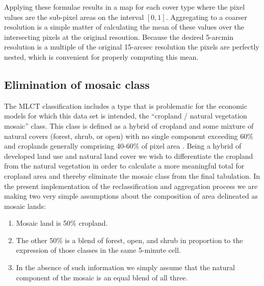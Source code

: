 Applying these formulae results in a map for each cover type where the
pixel values are the sub-pixel areas on the interval $[0,1]$.
Aggregating to a coarser resolution is a simple matter of calculating
the mean of these values over the intersecting pixels at the original
resoution.  Because the desired 5-arcmin resolution is a multiple of
the original 15-arcsec resolution the pixels are perfectly nested,
which is convenient for properly computing this mean.


\subsection{Elimination of mosaic class}
\label{sec:elimination}

The MLCT classification includes a type that is problematic for the
economic models for which this data set is intended, the ``cropland /
natural vegetation mosaic'' class.  This class is defined as a hybrid
of cropland and some mixture of natural covers (forest, shrub, or
open) with no single component exceeding 60\% \citep{Friedl2002} and
croplands generally comprising 40-60\% of pixel area . Being a hybrid of developed land use and natural land cover
we wish to differentiate the cropland from the natural vegetation in
order to calculate a more meaningful total for cropland area and
thereby eliminate the mosaic class from the final tabulation.  In the
present implementation of the reclassification and aggregation process
we are making two very simple assumptions about the composition of
area delineated as mosaic lands:

\begin{enumerate}
\item Mosaic land is 50\% cropland.
\item The other 50\% is a blend of forest, open, and shrub in
  proportion to the expression of those classes in the same 5-minute
  cell.
\item In the absence of such information we simply assume that the
  natural component of the mosaic is an equal blend of all three.
\end{enumerate}

